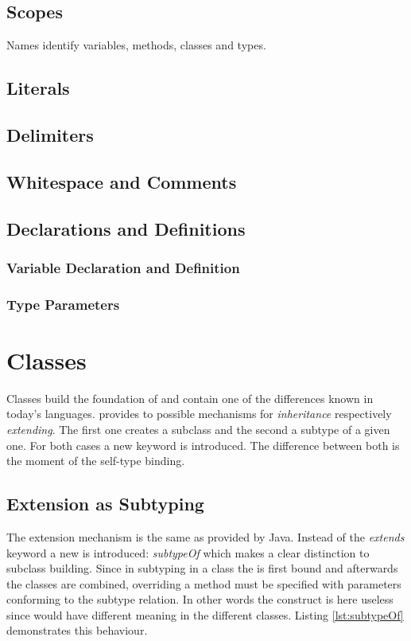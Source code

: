 \section{Scopes}
Names identify variables, methods, classes and types. 

\section{Literals}

\section{Delimiters}

\section{Whitespace and Comments}

\section{Declarations and Definitions}
\subsection{Variable Declaration and Definition}
\subsection{Type Parameters}

\chapter{Classes}
Classes build the foundation of \ooplss and contain one of the differences
known in today's languages. \ooplss provides to possible mechanisms for
\emph{inheritance} respectively \emph{extending}. The first one creates
a subclass and the second a subtype of a given one. For both cases a new
keyword is introduced. The difference between both is the moment of the
self-type binding.

\section{Extension as Subtyping}
The extension mechanism is the same as provided by Java. Instead of
the \emph{extends} keyword a new is introduced: \emph{subtypeOf} which
makes a clear distinction to subclass building. Since in subtyping in a
class the \mytype is first bound and afterwards the classes are combined,
overriding a method must be specified with parameters conforming to the
subtype relation. In other words the \mytype construct is here useless
since \mytype would have different meaning in the different classes. Listing
\ref{lst:subtypeOf} demonstrates this behaviour.

